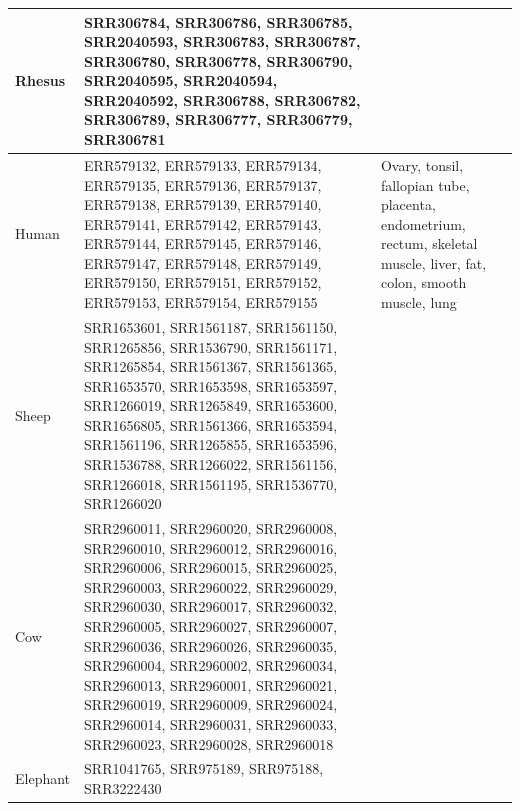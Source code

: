 \documentclass[fleqn,10pt]{wlscirep}
\begin{document}
\begin{center}
\begin{longtable}{|p{}|p{}|p{}|}
Rhesus    & SRR306784, SRR306786, SRR306785, SRR2040593, SRR306783, SRR306787, SRR306780, SRR306778, SRR306790, SRR2040595, SRR2040594, SRR2040592, SRR306788, SRR306782, SRR306789, SRR306777, SRR306779, SRR306781                                                                                                                                                                                                                                       &                                                                                                                       \\ \hline
Human     & ERR579132, ERR579133, ERR579134, ERR579135, ERR579136, ERR579137, ERR579138, ERR579139, ERR579140, ERR579141, ERR579142, ERR579143, ERR579144, ERR579145, ERR579146, ERR579147, ERR579148, ERR579149, ERR579150, ERR579151, ERR579152, ERR579153, ERR579154, ERR579155                                                                                                                                                                         & Ovary, tonsil, fallopian tube, placenta, endometrium, rectum, skeletal muscle, liver, fat, colon, smooth muscle, lung \\ \hline
Sheep     & SRR1653601, SRR1561187, SRR1561150, SRR1265856, SRR1536790, SRR1561171, SRR1265854, SRR1561367, SRR1561365, SRR1653570, SRR1653598, SRR1653597, SRR1266019, SRR1265849, SRR1653600, SRR1656805, SRR1561366, SRR1653594, SRR1561196, SRR1265855, SRR1653596, SRR1536788, SRR1266022, SRR1561156, SRR1266018, SRR1561195, SRR1536770, SRR1266020                                                                                                 &                                                                                                                       \\ \hline
Cow       & SRR2960011, SRR2960020, SRR2960008, SRR2960010, SRR2960012, SRR2960016, SRR2960006, SRR2960015, SRR2960025, SRR2960003, SRR2960022, SRR2960029, SRR2960030, SRR2960017, SRR2960032, SRR2960005, SRR2960027, SRR2960007, SRR2960036, SRR2960026, SRR2960035, SRR2960004, SRR2960002, SRR2960034, SRR2960013, SRR2960001, SRR2960021, SRR2960019, SRR2960009, SRR2960024, SRR2960014, SRR2960031, SRR2960033, SRR2960023, SRR2960028, SRR2960018 &                                                                                                                       \\ \hline
Elephant  & SRR1041765, SRR975189, SRR975188, SRR3222430                                                                                                                                                                                                                                                                                                                                                                                                   &                                                                                                                       \\ \hline

\end{longtable}
\end{center}
\end{document}
